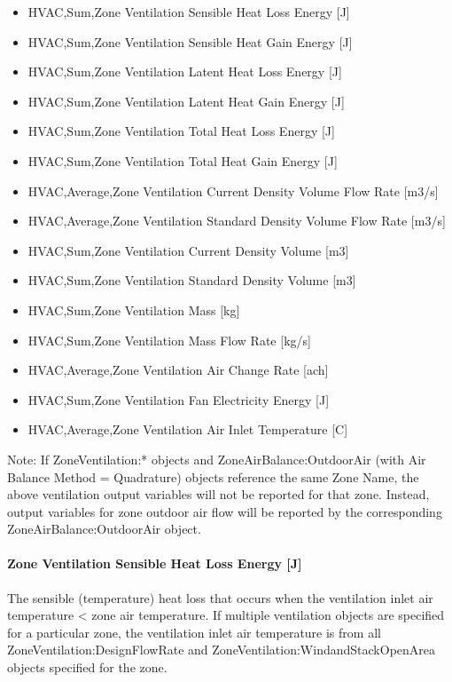 \begin{itemize}
\item
  HVAC,Sum,Zone Ventilation Sensible Heat Loss Energy {[}J{]}
\item
  HVAC,Sum,Zone Ventilation Sensible Heat Gain Energy {[}J{]}
\item
  HVAC,Sum,Zone Ventilation Latent Heat Loss Energy {[}J{]}
\item
  HVAC,Sum,Zone Ventilation Latent Heat Gain Energy {[}J{]}
\item
  HVAC,Sum,Zone Ventilation Total Heat Loss Energy {[}J{]}
\item
  HVAC,Sum,Zone Ventilation Total Heat Gain Energy {[}J{]}
\item
  HVAC,Average,Zone Ventilation Current Density Volume Flow Rate {[}m3/s{]}
\item
  HVAC,Average,Zone Ventilation Standard Density Volume Flow Rate {[}m3/s{]}
\item
  HVAC,Sum,Zone Ventilation Current Density Volume {[}m3{]}
\item
  HVAC,Sum,Zone Ventilation Standard Density Volume {[}m3{]}
\item
  HVAC,Sum,Zone Ventilation Mass {[}kg{]}
\item
  HVAC,Sum,Zone Ventilation Mass Flow Rate {[}kg/s{]}
\item
  HVAC,Average,Zone Ventilation Air Change Rate {[}ach{]}
\item
  HVAC,Sum,Zone Ventilation Fan Electricity Energy {[}J{]}
\item
  HVAC,Average,Zone Ventilation Air Inlet Temperature {[}C{]}
\end{itemize}

Note: If ZoneVentilation:* objects and ZoneAirBalance:OutdoorAir (with Air Balance Method = Quadrature) objects reference the same Zone Name, the above ventilation output variables will not be reported for that zone. Instead, output variables for zone outdoor air flow will be reported by the corresponding ZoneAirBalance:OutdoorAir object.

\paragraph{Zone Ventilation Sensible Heat Loss Energy {[}J{]}}\label{zone-ventilation-sensible-heat-loss-energy-j}

The sensible (temperature) heat loss that occurs when the ventilation inlet air temperature \textless{} zone air temperature. If multiple ventilation objects are specified for a particular zone, the ventilation inlet air temperature is from all ZoneVentilation:DesignFlowRate and ZoneVentilation:WindandStackOpenArea objects specified for the zone.

